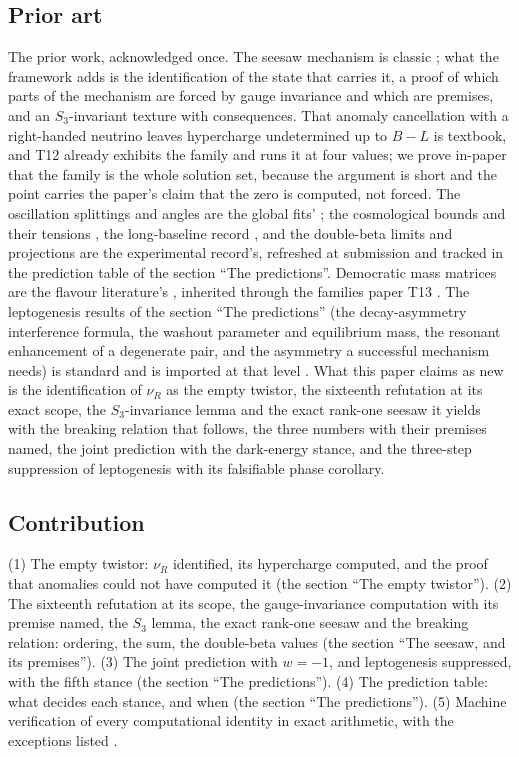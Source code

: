 \documentclass[11pt]{article}
\theoremstyle{definition}
\theoremstyle{plain}
\begin{document}
\subsection*{Prior art}
\label{c:note.neutrino.setting-prior-art}
The prior work, acknowledged once. The seesaw mechanism is classic \cite{Minkowski1977, GRS1979, Yanagida1980, MohapatraSenjanovic1980}; what the framework adds is the identification of the state that carries it, a proof of which parts of the mechanism are forced by gauge invariance and which are premises, and an $S_{3}$-invariant texture with consequences. That anomaly cancellation with a right-handed neutrino leaves hypercharge undetermined up to $B - L$ is textbook, and T12 already exhibits the family and runs it at four values; we prove in-paper that the family is the whole solution set, because the argument is short and the point carries the paper's claim that the zero is computed, not forced. The oscillation splittings and angles are the global fits' \cite{PDG2024, NuFIT2024}; the cosmological bounds and their tensions \cite{DESI2025, HouWangZhaoZhang2026}, the long-baseline record \cite{T2KNOvA2025}, and the double-beta limits and projections \cite{KamLANDZen2023, LEGEND2021} are the experimental record's, refreshed at submission and tracked in the prediction table of the section ``The predictions''. Democratic mass matrices are the flavour literature's \cite{HHW1978}, inherited through the families paper T13 \cite{ButlerT13}. The leptogenesis results of the section ``The predictions'' (the decay-asymmetry interference formula, the washout parameter and equilibrium mass, the resonant enhancement of a degenerate pair, and the asymmetry a successful mechanism needs) is standard and is imported at that level \cite{FukugitaYanagida1986, DavidsonNardiNir2008, PilaftsisUnderwood2004}. What this paper claims as new is the identification of $\nu_{R}$ as the empty twistor, the sixteenth refutation at its exact scope, the $S_{3}$-invariance lemma and the exact rank-one seesaw it yields with the breaking relation that follows, the three numbers with their premises named, the joint prediction with the dark-energy stance, and the three-step suppression of leptogenesis with its falsifiable phase corollary.

\subsection*{Contribution}
\label{c:note.neutrino.setting-contribution}
(1) The empty twistor: $\nu_{R}$ identified, its hypercharge computed, and the proof that anomalies could not have computed it (the section ``The empty twistor''). (2) The sixteenth refutation at its scope, the gauge-invariance computation with its premise named, the $S_{3}$ lemma, the exact rank-one seesaw and the breaking relation: ordering, the sum, the double-beta values (the section ``The seesaw, and its premises''). (3) The joint prediction with $w = -1$, and leptogenesis suppressed, with the fifth stance (the section ``The predictions''). (4) The prediction table: what decides each stance, and when (the section ``The predictions''). (5) Machine verification of every computational identity in exact arithmetic, with the exceptions listed \cite{ButlerVerifyT15}.
\end{document}
